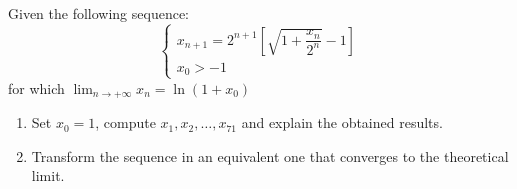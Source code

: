 \documentclass[12pt, a4paper]{report}
\newtheorem[style=M,bodystyle=\normalfont]{theorem}{Theorem}
\newtheorem[style=M,bodystyle=\normalfont]{corollary}{Corollary}
\newtheorem[style=M,bodystyle=\normalfont]{lemma}{Lemma}
\newtheorem[style=M,bodystyle=\normalfont]{definition}{Definition}
\begin{document}
    \begin{Exercise}[label=13]
        Given the following sequence:
        \[
          \begin{cases}
                x_{n+1}=2^{n+1}\left[ \sqrt{1+\dfrac{x_n}{2^n}}-1 \right] \\
                x_0>-1
          \end{cases}  
        \]
        for which $\lim_{n \rightarrow + \infty}x_n=\ln\left({1+x_0}\right)$
        \begin{enumerate}
            \item Set $x_0 = 1$, compute $x_1, x_2, \dots , x_{71}$ and explain the obtained results.
            \item Transform the sequence in an equivalent one that converges to the theoretical limit.
        \end{enumerate}


    \end{Exercise}
    \begin{Answer}[ref=13]
        
    \end{Answer}
\end{document}
